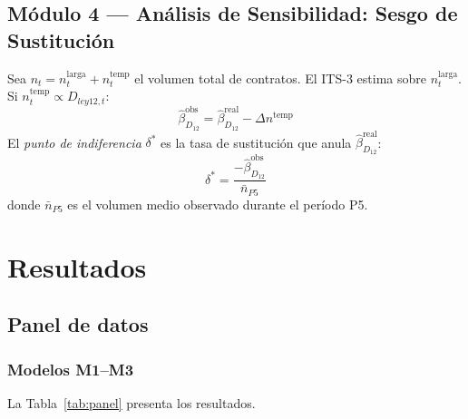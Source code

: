 \documentclass[10pt,a4paper,twocolumn]{article}
\begin{document}
\subsection{Módulo 4 — Análisis de Sensibilidad: Sesgo de Sustitución}

Sea $n_t = n_t^{\text{larga}} + n_t^{\text{temp}}$ el volumen total de contratos.
El ITS-3 estima sobre $n_t^{\text{larga}}$. Si $n_t^{\text{temp}} \propto D_{ley12,t}$:
\begin{equation}
  \hat\beta_{D_{12}}^{\text{obs}} = \hat\beta_{D_{12}}^{\text{real}} - \Delta n^{\text{temp}}
  \label{eq:proxy}
\end{equation}
El \textit{punto de indiferencia} $\delta^*$ es la tasa de sustitución que anula
$\hat\beta_{D_{12}}^{\text{real}}$:
\begin{equation}
  \delta^* = \frac{-\hat\beta_{D_{12}}^{\text{obs}}}{\bar{n}_{P5}}
  \label{eq:indif}
\end{equation}
donde $\bar{n}_{P5}$ es el volumen medio observado durante el período P5.

\section{Resultados}
\label{sec:resultados}

\subsection{Panel de datos}

\subsubsection{Modelos M1--M3}

La Tabla~\ref{tab:panel} presenta los resultados.
\end{document}
